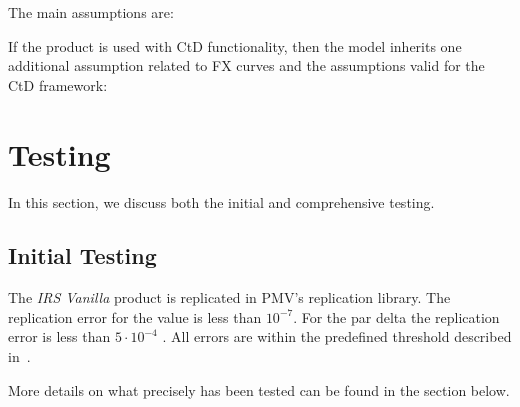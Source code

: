 \documentclass[]{pmv_report} %
\begin{document}
The main assumptions are:





If the product is used with CtD functionality, then the model inherits one additional assumption related to FX curves and the assumptions valid for the CtD framework:







\section{Testing} \label{sec:Testing}

In this section, we discuss both the initial and comprehensive testing.

\subsection{Initial Testing}

The \textit{IRS Vanilla} product is replicated in PMV's replication library.
The replication error for the value is less than $10^{-7}$.
For the par delta the replication error is less than $5 \cdot 10^{-4}$ \cite{Mx.RateCurve}.
All errors are within the predefined threshold described in~\cite{PMVPricingModelsTestingTolerancesGuidelines}.

More details on what precisely has been tested can be found in the section below.
\end{document}
